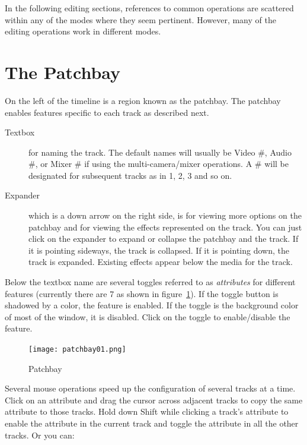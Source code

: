 In the following editing sections, references to common operations
are scattered within any of the modes where they seem pertinent.
However, many of the editing operations work in different modes.


\section{The Patchbay}%
\label{sec:patchbay}

On the left of the timeline is a region known as the patchbay.  The
patchbay enables features specific to each track as described next.


\begin{description}
\item[Textbox] for naming the track.  The default names will usually
  be Video \#, Audio \#, or Mixer \# if using the multi-camera/mixer
  operations.  A \# will be designated for subsequent tracks as in 1,
  2, 3 and so on.
\item[Expander] which is a down arrow on the right side, is for
  viewing more options on the patchbay and for viewing the effects
  represented on the track.  You can just click on the expander to
  expand or collapse the patchbay and the track.  If it is pointing
  sideways, the track is collapsed.  If it is pointing down, the track
  is expanded.  Existing effects appear below the media for the track.
\end{description}

Below the textbox name are several toggles referred to as
\textit{attributes} for different features (currently there are 7 as
shown in figure~\ref{fig:patchbay01}).  If the toggle button is
shadowed by a color, the feature is enabled. If the toggle is the
background color of most of the window, it is disabled. Click on the
toggle to enable/disable the feature.

\begin{figure}
  \centering
  \texttt{[image: patchbay01.png]}
  \caption{Patchbay}
  \label{fig:patchbay01}
\end{figure}

Several mouse operations speed up the configuration of several
tracks at a time. Click on an attribute and drag the cursor across
adjacent tracks to copy the same attribute to those tracks.  Hold
down Shift while clicking a track's attribute to enable the
attribute in the current track and toggle the attribute in all the
other tracks. Or you can:

